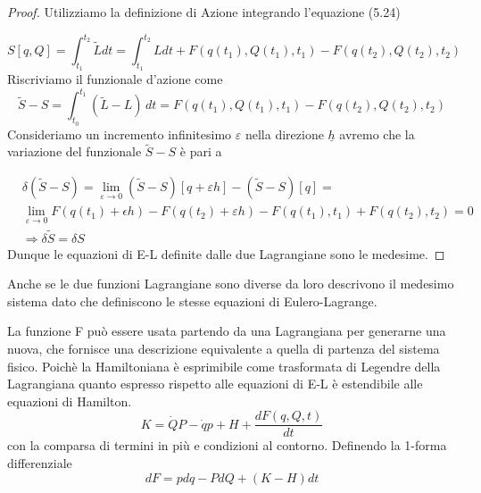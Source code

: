 \begin{proof}
Utilizziamo la definizione di Azione integrando l'equazione (5.24)

\begin{equation*}
	S[q,Q]=\int_{t_1}^{t_2} \tilde{L} d t=\int_{t_1}^{t_2} L d t+F\left(q\left(t_1\right), Q\left(t_1\right), t_1\right)-F\left(q\left(t_2\right), Q\left(t_2\right), t_2\right) 
\end{equation*} 
Riscriviamo il funzionale d'azione come
\begin{equation*}
	\tilde{S} -S  = \int_{t_0}^{t_1} (\tilde{L} -L) \, dt =   F\left(q\left(t_1\right), Q\left(t_1\right), t_1\right)-F\left(q\left(t_2\right), Q\left(t_2\right), t_2\right) 
\end{equation*}
Consideriamo un incremento infinitesimo $\varepsilon$ nella direzione $\underline{h}$ avremo che la variazione del funzionale $\tilde{S}-S $ \`{e} pari a 

\begin{align*}
	&\delta(\tilde{S}-S) = \lim_{\varepsilon \rightarrow 0} (\tilde{S}-S)[q+\varepsilon h] - (\tilde S-S)[q]= & \\[0.1in]
	&\lim_{\varepsilon \rightarrow 0} F(q(t_{1})+\epsilon h)- F(q(t_{2})+ \varepsilon h) - F\left(q\left(t_1\right), t_1\right)+F\left(q\left(t_2\right), t_2\right)= 0& \\[0.1in]
	& \Rightarrow \delta \tilde{S} = \delta S
\end{align*}
Dunque le equazioni di E-L definite dalle due Lagrangiane sono le medesime.
\end{proof}

\begin{remark}
Anche se le due funzioni Lagrangiane sono diverse da loro descrivono il medesimo sistema dato che definiscono le stesse equazioni di Eulero-Lagrange. 
\end{remark}

La funzione F pu\`{o} essere usata partendo da una Lagrangiana per generarne una nuova, che fornisce una descrizione equivalente a quella di partenza del sistema fisico.\newline
Poich\`{e} la Hamiltoniana \`{e} esprimibile come trasformata di Legendre della Lagrangiana quanto espresso rispetto alle equazioni di E-L \`{e} estendibile alle equazioni di Hamilton.
\begin{equation}
	K = \dot{Q}P - \dot{q}p + H + \frac{dF(q,Q,t)}{dt}
\end{equation}
con la comparsa di termini in pi\`{u} e condizioni al contorno. Definendo la 1-forma differenziale
\begin{equation}
	dF =  pdq - PdQ + (K-H)dt
\end{equation}
